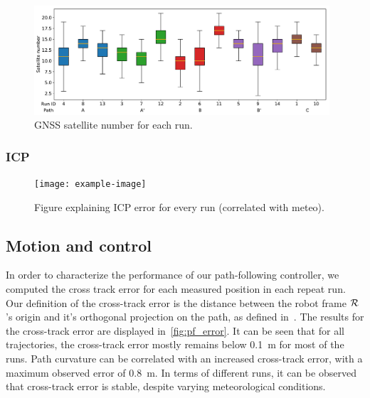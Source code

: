\begin{figure} [htpb]
	\centering
	\includegraphics[height=1.6in]{./figs/GPS/Satellite_number.pdf}
	\caption{GNSS satellite number for each run.}
	\label{fig:gnss_satellite_number}
\end{figure}



\subsubsection{ICP}
\label{sec:ICP}

\lightlipsum[1]

\begin{figure} [htpb]
	\centering
	\texttt{[image: example-image]}
	\caption{Figure explaining ICP error for every run (correlated with meteo).}
	\label{fig:icp_error}
\end{figure}



\subsection{Motion and control}
\label{sec:res_motion}

In order to characterize the performance of our path-following controller, we computed the cross track error for each measured position in each repeat run.
Our definition of the cross-track error is the distance between the robot frame $\mathcal{R}$'s origin and it's orthogonal projection on the path, as defined in~\citep{Mondoloni2005}.
The results for the cross-track error are displayed in~\autoref{fig:pf_error}.
It can be seen that for all trajectories, the cross-track error mostly remains below \SI{0.1}{m} for most of the runs.
Path curvature can be correlated with an increased cross-track error, with a maximum observed error of \SI{0.8}{m}.
In terms of different runs, it can be observed that cross-track error is stable, despite varying meteorological conditions. 

